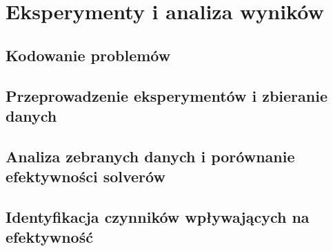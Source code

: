\chapter{Eksperymenty i analiza wyników}

\section{Kodowanie problemów}

\section{Przeprowadzenie eksperymentów i zbieranie danych}

\section{Analiza zebranych danych i porównanie efektywności solverów}

\section{Identyfikacja czynników wpływających na efektywność}

